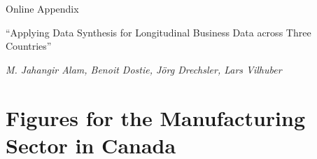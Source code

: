
\newpage



\FloatBarrier

\appendix

\begin{center}
{\LARGE{Online Appendix}}

{``Applying Data Synthesis for Longitudinal Business Data across Three Countries''}

\textit{M. Jahangir Alam, Benoit Dostie, J\"org Drechsler, Lars Vilhuber}

\end{center}


\section{Figures for the Manufacturing Sector in Canada}
\label{sec:appendix_figures}

